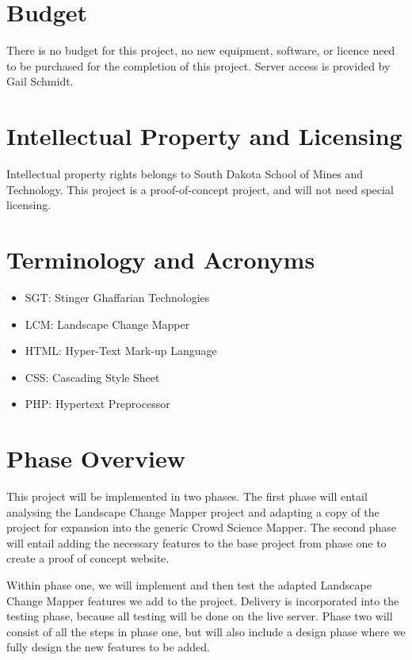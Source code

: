 \section{Budget}
There is no budget for this project, no new equipment, software, or licence need to be purchased for the completion of this project. Server access is provided by Gail Schmidt.

\section{Intellectual Property and Licensing}
Intellectual property rights belongs to South Dakota School of Mines and Technology. This project is a proof-of-concept project, and will not need special licensing.

\section{Terminology and Acronyms}
\begin{itemize}
\itemsep0em
\item SGT: Stinger Ghaffarian Technologies
\item LCM: Landscape Change Mapper
\item HTML: Hyper-Text Mark-up Language
\item CSS: Cascading Style Sheet
\item PHP: Hypertext Preprocessor
\end{itemize}

\section{Phase  Overview}
This project will be implemented in two phases. The first phase will entail analysing the Landscape Change Mapper project and adapting a copy of the project for expansion into the generic Crowd Science Mapper. The  second phase will entail adding the necessary features to the base project from phase one to create a proof of concept website.

Within phase one, we will implement and then test the adapted Landscape Change Mapper features we add to the project. Delivery is incorporated into the testing phase, because all testing will be done on the live server. Phase two will consist of all the steps in phase one, but will also include a design phase where we fully design the new features to be added.

